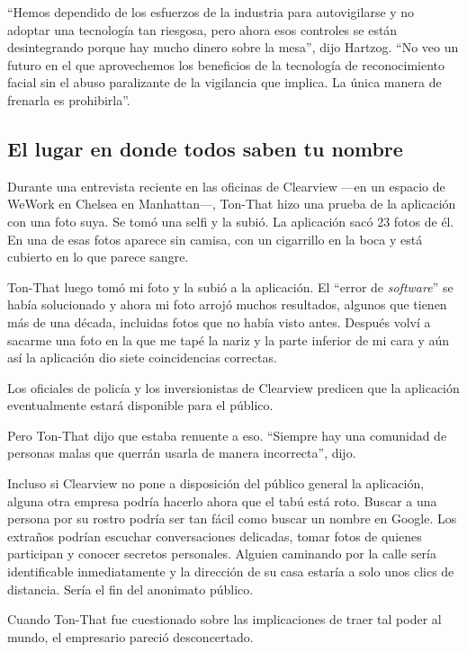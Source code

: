 ``Hemos dependido de los esfuerzos de la industria para autovigilarse y
no adoptar una tecnología tan riesgosa, pero ahora esos controles se
están desintegrando porque hay mucho dinero sobre la mesa'', dijo
Hartzog. ``No veo un futuro en el que aprovechemos los beneficios de la
tecnología de reconocimiento facial sin el abuso paralizante de la
vigilancia que implica. La única manera de frenarla es prohibirla''.

\hypertarget{el-lugar-en-donde-todos-saben-tu-nombre}{%
\subsection{El lugar en donde todos saben tu
nombre}\label{el-lugar-en-donde-todos-saben-tu-nombre}}

Durante una entrevista reciente en las oficinas de Clearview ---en un
espacio de WeWork en Chelsea en Manhattan---, Ton-That hizo una prueba
de la aplicación con una foto suya. Se tomó una selfi y la subió. La
aplicación sacó 23 fotos de él. En una de esas fotos aparece sin camisa,
con un cigarrillo en la boca y está cubierto en lo que parece sangre.

Ton-That luego tomó mi foto y la subió a la aplicación. El ``error de
\emph{software}'' se había solucionado y ahora mi foto arrojó muchos
resultados, algunos que tienen más de una década, incluidas fotos que no
había visto antes. Después volví a sacarme una foto en la que me tapé la
nariz y la parte inferior de mi cara y aún así la aplicación dio siete
coincidencias correctas.

Los oficiales de policía y los inversionistas de Clearview predicen que
la aplicación eventualmente estará disponible para el público.

Pero Ton-That dijo que estaba renuente a eso. ``Siempre hay una
comunidad de personas malas que querrán usarla de manera incorrecta'',
dijo.

Incluso si Clearview no pone a disposición del público general la
aplicación, alguna otra empresa podría hacerlo ahora que el tabú está
roto. Buscar a una persona por su rostro podría ser tan fácil como
buscar un nombre en Google. Los extraños podrían escuchar conversaciones
delicadas, tomar fotos de quienes participan y conocer secretos
personales. Alguien caminando por la calle sería identificable
inmediatamente y la dirección de su casa estaría a solo unos clics de
distancia. Sería el fin del anonimato público.

Cuando Ton-That fue cuestionado sobre las implicaciones de traer tal
poder al mundo, el empresario pareció desconcertado.

